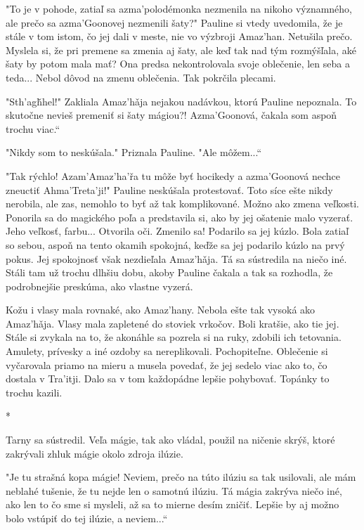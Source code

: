 \documentclass{book}
\begin{document}
"$ $To je v pohode, zatiaľ sa azma'polodémonka nezmenila na nikoho významného, ale prečo sa azma'Goonovej nezmenili šaty?"$ $ Pauline si vtedy uvedomila, že je stále v tom istom, čo jej dali v meste, nie vo výzbroji Amaz'han. Netušila prečo. Myslela si, že pri premene sa zmenia aj šaty, ale keď tak nad tým rozmýšľala, aké šaty by potom mala mať? Ona predsa nekontrolovala svoje oblečenie, len seba a teda... Nebol dôvod na zmenu oblečenia. Tak pokrčila plecami.

"$ $Sth'agh\v{}hel!"$ $ Zakliala Amaz'ha\v{}ja nejakou nadávkou, ktorú Pauline nepoznala. To skutočne nevieš premeniť si šaty mágiou?! Azma'Goonová, čakala som aspoň trochu viac.“

"$ $Nikdy som to neskúšala."$ $ Priznala Pauline. "$ $Ale môžem...“

"$ $Tak rýchlo! Azam'Amaz'ha'r\v{}a tu môže byť hocikedy a azma'Goonová nechce zneuctiť Ahma'Treta'ji!"$ $ Pauline neskúšala protestovať. Toto síce ešte nikdy nerobila, ale zas, nemohlo to byť až tak komplikované. Možno ako zmena veľkosti. Ponorila sa do magického poľa a predstavila si, ako by jej ošatenie malo vyzerať. Jeho veľkosť, farbu... Otvorila oči. Zmenilo sa! Podarilo sa jej kúzlo. Bola zatiaľ so sebou, aspoň na tento okamih spokojná, keďže sa jej podarilo kúzlo na prvý pokus. Jej spokojnosť však nezdieľala Amaz'ha\v{}ja. Tá sa sústredila na niečo iné. Stáli tam už trochu dlhšiu dobu, akoby Pauline čakala a tak sa rozhodla, že podrobnejšie preskúma, ako vlastne vyzerá.

Kožu i vlasy mala rovnaké, ako Amaz'hany. Nebola ešte tak vysoká ako Amaz'ha\v{}ja. Vlasy mala zapletené do stoviek vrkočov. Boli kratšie, ako tie jej. Stále si zvykala na to, že akonáhle sa pozrela si na ruky, zdobili ich tetovania. Amulety, prívesky a iné ozdoby sa nereplikovali. Pochopiteľne. Oblečenie si vyčarovala priamo na mieru a musela povedať, že jej sedelo viac ako to, čo dostala v Tra'itji. Dalo sa v tom každopádne lepšie pohybovať. Topánky to trochu kazili.

\begin{center}
*
\end{center}

Tarny sa sústredil. Veľa mágie, tak ako vládal, použil na ničenie skrýš, ktoré zakrývali zhluk mágie okolo zdroja ilúzie.

"$ $Je tu strašná kopa mágie! Neviem, prečo na túto ilúziu sa tak usilovali, ale mám neblahé tušenie, že tu nejde len o samotnú ilúziu. Tá mágia zakrýva niečo iné, ako len to čo sme si mysleli, až sa to mierne desím zničiť. Lepšie by aj možno bolo vstúpiť do tej ilúzie, a neviem...“
\end{document}
